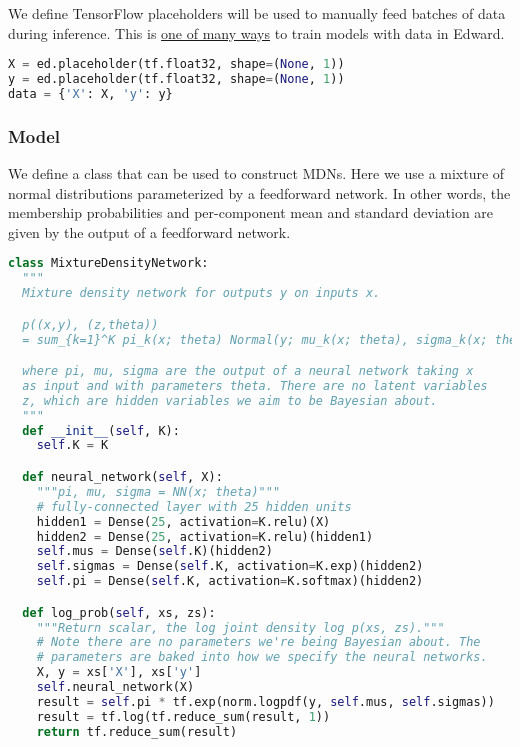 We define TensorFlow placeholders will be used to manually feed batches of data during inference. This is \href{http://edwardlib.org/api/data}{one of many ways} to train models with data in Edward.

\begin{lstlisting}[language=Python]
X = ed.placeholder(tf.float32, shape=(None, 1))
y = ed.placeholder(tf.float32, shape=(None, 1))
data = {'X': X, 'y': y}
\end{lstlisting}


\subsubsection{Model}

We define a class that can be used to construct MDNs. Here we use a
mixture of normal distributions parameterized by a feedforward
network. In other words, the membership probabilities and
per-component mean and standard deviation are given by the output of a
feedforward network.

\begin{lstlisting}[language=Python]
class MixtureDensityNetwork:
  """
  Mixture density network for outputs y on inputs x.

  p((x,y), (z,theta))
  = sum_{k=1}^K pi_k(x; theta) Normal(y; mu_k(x; theta), sigma_k(x; theta))

  where pi, mu, sigma are the output of a neural network taking x
  as input and with parameters theta. There are no latent variables
  z, which are hidden variables we aim to be Bayesian about.
  """
  def __init__(self, K):
    self.K = K

  def neural_network(self, X):
    """pi, mu, sigma = NN(x; theta)"""
    # fully-connected layer with 25 hidden units
    hidden1 = Dense(25, activation=K.relu)(X)
    hidden2 = Dense(25, activation=K.relu)(hidden1)
    self.mus = Dense(self.K)(hidden2)
    self.sigmas = Dense(self.K, activation=K.exp)(hidden2)
    self.pi = Dense(self.K, activation=K.softmax)(hidden2)

  def log_prob(self, xs, zs):
    """Return scalar, the log joint density log p(xs, zs)."""
    # Note there are no parameters we're being Bayesian about. The
    # parameters are baked into how we specify the neural networks.
    X, y = xs['X'], xs['y']
    self.neural_network(X)
    result = self.pi * tf.exp(norm.logpdf(y, self.mus, self.sigmas))
    result = tf.log(tf.reduce_sum(result, 1))
    return tf.reduce_sum(result)
\end{lstlisting}

